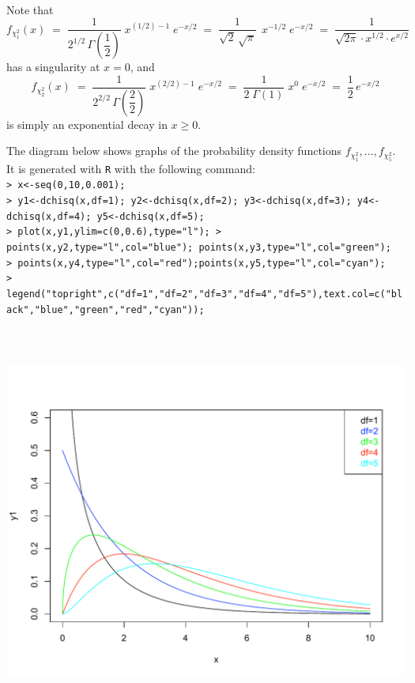 \documentclass{article}
\begin{document}
\begin{remark}\mbox{}\\
Note that
\begin{equation*}
          f_{\chi^{2}_{1}}(x)
\; = \; \dfrac{1}{2^{1/2}\,\Gamma\!\left(\dfrac{1}{2}\right)} \; x^{(1/2)-1} \; e^{-x/2}
\; = \; \dfrac{1}{\sqrt{2}\,\sqrt{\pi}}\;\,x^{-1/2} \; e^{-x/2}
\; = \; \dfrac{1}{\sqrt{2\pi} \cdot x^{1/2} \cdot e^{x/2}}
\end{equation*}
has a singularity at $x=0$, and
\begin{equation*}
          f_{\chi^{2}_{2}}(x)
\; = \; \dfrac{1}{2^{2/2}\,\Gamma\!\left(\dfrac{2}{2}\right)} \; x^{(2/2)-1} \; e^{-x/2}
\; = \; \dfrac{1}{{2}\;\Gamma\!\left(1\right)}\;x^{0} \; e^{-x/2}
\; = \; \dfrac{1}{2}\,e^{-x/2}
\end{equation*}
is simply an exponential decay in $x \geq 0$.
\end{remark}

The diagram below shows graphs of the probability density functions $f_{\chi^{2}_{1}}, \ldots, f_{\chi^{2}_{5}}$.
It is generated with \texttt{R} with the following command:
\vskip 0.2cm
\texttt{
\small
\noindent\mbox{}\\
> x<-seq(0,10,0.001);  \\
> y1<-dchisq(x,df=1); y2<-dchisq(x,df=2); y3<-dchisq(x,df=3); y4<-dchisq(x,df=4); y5<-dchisq(x,df=5); \\
> plot(x,y1,ylim=c(0,0.6),type="l");
> points(x,y2,type="l",col="blue"); points(x,y3,type="l",col="green"); \\
> points(x,y4,type="l",col="red");points(x,y5,type="l",col="cyan"); \\
> legend("topright",c("df=1","df=2","df=3","df=4","df=5"),text.col=c("black","blue","green","red","cyan"));}
\mbox{}
\begin{center}
\vskip -1.3cm
\includegraphics[height=13.0cm,width=16cm]{ChiSquare-df1-thru-df5.pdf}
\end{center}
\end{document}

